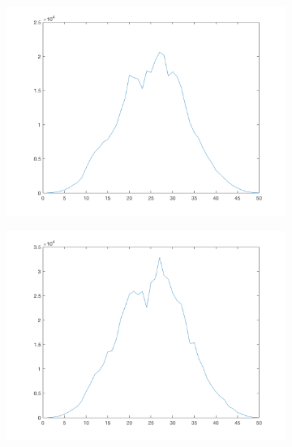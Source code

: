 \begin{figure}[htpb]
\begin{subfigure}{.25\textwidth}
\end{subfigure}%
\begin{subfigure}{.25\textwidth}
\includegraphics[width=1\textwidth]{img/ProjYI1sigma150}
\end{subfigure}%
\begin{subfigure}{.25\textwidth}
\includegraphics[width=1\textwidth]{img/ProjYI1sigma300}
\end{subfigure}
\quad
\begin{subfigure}{.25\textwidth}

\end{subfigure}
\end{figure}
